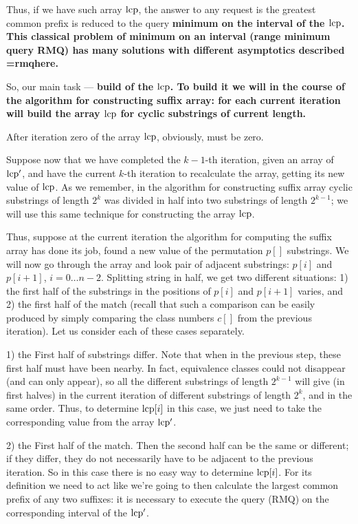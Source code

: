 Thus, if we have such array $\rm lcp$, the answer to any request is the greatest common prefix is reduced to the query \bf{minimum on the interval} of the $\rm lcp$. This classical problem of minimum on an interval (range minimum query RMQ) has many solutions with different asymptotics described \algohref=rmq{here}.

So, our main task --- \bf{build} of the $\rm lcp$. To build it we will in the course of the algorithm for constructing suffix array: for each current iteration will build the array $\rm lcp$ for cyclic substrings of current length.

After iteration zero of the array $\rm lcp$, obviously, must be zero.

Suppose now that we have completed the $k-1$-th iteration, given an array of $\rm lcp^\prime$, and have the current $k$-th iteration to recalculate the array, getting its new value of $\rm lcp$. As we remember, in the algorithm for constructing suffix array cyclic substrings of length $2^k$ was divided in half into two substrings of length $2^{k-1}$; we will use this same technique for constructing the array $\rm lcp$.

Thus, suppose at the current iteration the algorithm for computing the suffix array has done its job, found a new value of the permutation $p[]$ substrings. We will now go through the array and look pair of adjacent substrings: $p[i]$ and $p[i+1]$, $i=0 \ldots n-2$. Splitting string in half, we get two different situations: 1) the first half of the substrings in the positions of $p[i]$ and $p[i+1]$ varies, and 2) the first half of the match (recall that such a comparison can be easily produced by simply comparing the class numbers $c[]$ from the previous iteration). Let us consider each of these cases separately.

1) the First half of substrings differ. Note that when in the previous step, these first half must have been nearby. In fact, equivalence classes could not disappear (and can only appear), so all the different substrings of length $2^{k-1}$ will give (in first halves) in the current iteration of different substrings of length $2^k$, and in the same order. Thus, to determine ${\rm lcp}[i]$ in this case, we just need to take the corresponding value from the array $\rm lcp^\prime$.

2) the First half of the match. Then the second half can be the same or different; if they differ, they do not necessarily have to be adjacent to the previous iteration. So in this case there is no easy way to determine ${\rm lcp}[i]$. For its definition we need to act like we're going to then calculate the largest common prefix of any two suffixes: it is necessary to execute the query (RMQ) on the corresponding interval of the $\rm lcp^\prime$.

